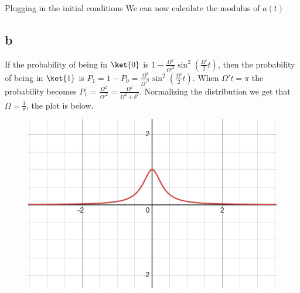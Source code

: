 Plugging in the initial conditions
We can now calculate the modulus of $a(t)$
\subsection*{b}
If the probability of being in $\ket{0}$ is $1-\frac{\Omega^2}{\Omega'^2}\sin^2(\frac{\Omega'}{2}t)$, then the probability of being in $\ket{1}$ is $P_1 = 1- P_0 = \frac{\Omega^2}{\Omega'^2}\sin^2(\frac{\Omega'}{2}t)$. When $\Omega't = \pi$ the probability becomes $P_1 = \frac{\Omega^2}{\Omega'^2}=\frac{\Omega^2}{\Omega^2+\delta^2}$.
Normalizing the distribution we get that $\Omega = \frac{1}{\pi}$, the plot is below.
\begin{figure}[h]
    \centering
    \includegraphics[width=0.5\linewidth]{Resources//245//Homework 2/245 Homework 2 Problem 5.png}
    \label{fig:enter-label}
\end{figure}